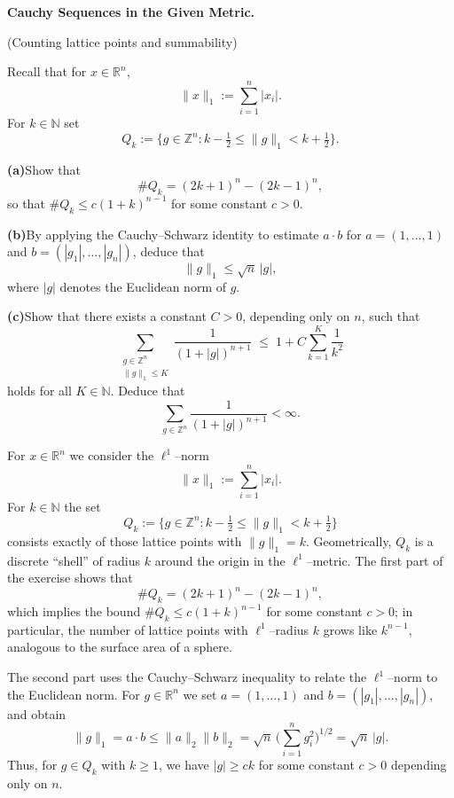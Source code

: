 \begin{problem}[CP-II-0358]
\label{prob:cp-ii-0358}
\textbf{Cauchy Sequences in the Given Metric.}

\hspace*{1.5em}(Counting lattice points and summability)

Recall that for $x \in \mathbb{R}^n$,
\[
\|x\|_1 := \sum_{i=1}^n |x_i|.
\]
For $k \in \mathbb{N}$ set
\[
Q_k := \bigl\{ g \in \mathbb{Z}^n : k - \tfrac12 \le \|g\|_1 < k + \tfrac12 \bigr\}.
\]

	\par\smallskip\noindent\textbf{(a)}\quad Show that
	\[
	\#Q_k = (2k+1)^n - (2k-1)^n,
	\]
	so that $\#Q_k \le c(1+k)^{n-1}$ for some constant $c>0$.

	\par\smallskip\noindent\textbf{(b)}\quad By applying the Cauchy--Schwarz identity to estimate $a\cdot b$
	for $a=(1,\dots,1)$ and $b=(|g_1|,\dots,|g_n|)$, deduce that
	\[
	\|g\|_1 \le \sqrt{n}\,|g|,
	\]
	where $|g|$ denotes the Euclidean norm of $g$.

	\par\smallskip\noindent\textbf{(c)}\quad Show that there exists a constant $C>0$, depending only on $n$, such that
	\[
	\sum_{\substack{g\in\mathbb{Z}^n \\ \|g\|_1\le K}}
	\frac{1}{(1+|g|)^{n+1}}
	\;\le\;
	1 + C \sum_{k=1}^K \frac{1}{k^2}
	\]
	holds for all $K\in\mathbb{N}$. Deduce that
	\[
	\sum_{g\in\mathbb{Z}^n} \frac{1}{(1+|g|)^{n+1}} < \infty.
	\]

For $x\in\mathbb{R}^n$ we consider the $\ell^1$--norm
\[
\|x\|_1 := \sum_{i=1}^n |x_i|.
\]
For $k\in\mathbb{N}$ the set
\[
Q_k := \bigl\{ g\in\mathbb{Z}^n :
k-\tfrac12 \le \|g\|_1 < k+\tfrac12 \bigr\}
\]
consists exactly of those lattice points with $\|g\|_1=k$.  Geometrically,
$Q_k$ is a discrete ``shell'' of radius $k$ around the origin in the
$\ell^1$--metric.  The first part of the exercise shows that
\[
\#Q_k = (2k+1)^n - (2k-1)^n,
\]
which implies the bound $\#Q_k \le c(1+k)^{n-1}$ for some constant $c>0$;
in particular, the number of lattice points with $\ell^1$--radius $k$
grows like $k^{n-1}$, analogous to the surface area of a sphere.

The second part uses the Cauchy--Schwarz inequality to relate the
$\ell^1$--norm to the Euclidean norm.  For $g\in\mathbb{R}^n$ we set
$a=(1,\dots,1)$ and $b=(|g_1|,\dots,|g_n|)$, and obtain
\[
\|g\|_1 = a\cdot b \le \|a\|_2\|b\|_2
= \sqrt{n}\,\biggl(\sum_{i=1}^n g_i^2\biggr)^{1/2}
= \sqrt{n}\,|g|.
\]
Thus, for $g\in Q_k$ with $k\ge1$, we have $|g|\ge c k$ for some constant
$c>0$ depending only on $n$.


\end{problem}
